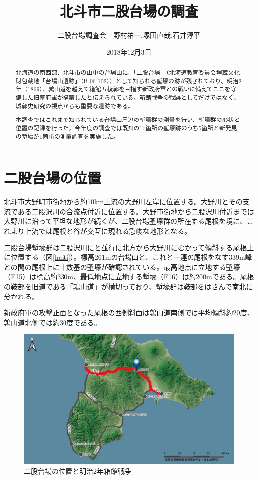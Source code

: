 \documentclass[14Q]{jsarticle}
\title{北斗市二股台場の調査}%
\date{2018年12月3日}
\author{二股台場調査会　野村祐一,塚田直哉,石井淳平}              %
\begin{document}
\maketitle
\begin{abstract}
北海道の南西部、北斗市の山中の台場山に、「二股台場」（北海道教育委員会埋蔵文化財包蔵地「台場山遺跡」（B-06-102））として知られる塹壕の跡が残されており、明治2年（1869）、鶉山道を越えて箱館五稜郭を目指す新政府軍との戦いに備えてここを守備した旧幕府軍が構築したと伝えられている。箱館戦争の戦跡としてだけではなく、城郭史研究の視点からも重要な遺跡である。

本調査ではこれまで知られている台場山周辺の塹壕群の測量を行い、塹壕群の形状と位置の記録を行った。今年度の調査では既知の17箇所の塹壕跡のうち5箇所と新発見の塹壕跡1箇所の測量調査を実施した。
\end{abstract}

\section{二股台場の位置}
北斗市大野町市街地から約10km上流の大野川左岸に位置する。大野川とその支流である二股沢川の合流点付近に位置する。大野市街地から二股沢川付近までは大野川に沿って平坦な地形が続くが、二股台場塹壕群の所在する尾根を境に、これより上流では尾根と谷が交互に現れる急峻な地形となる。

二股台場塹壕群は二股沢川にと並行に北方から大野川にむかって傾斜する尾根上に位置する（図\ref{haiti}）。標高261mの台場山と、これと一連の尾根をなす339m峰との間の尾根上に十数基の塹壕が確認されている。最高地点に立地する塹壕（F15）は標高約330m、最低地点に立地する塹壕（F16）は約200mである。尾根の鞍部を旧道である「鶉山道」が横切っており、塹壕群は鞍部をはさんで南北に分かれる。

新政府軍の攻撃正面となった尾根の西側斜面は鶉山道南側では平均傾斜約20度、鶉山道北側では約30度である。

\begin{figure}[h]
\centering
\includegraphics[width=160truemm]{fig/dounan.pdf}
\caption{二股台場の位置と明治2年箱館戦争}
\end{figure}
\end{document}
